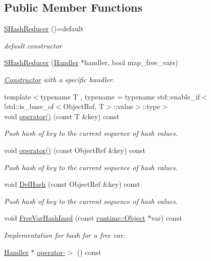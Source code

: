 \subsection*{Public Member Functions}
\begin{DoxyCompactItemize}
\item 
\hyperlink{classtvm_1_1SHashReducer_af7eb7ccc3e5863fe580f1b8dceac5d88}{S\+Hash\+Reducer} ()=default
\begin{DoxyCompactList}\small\item\em default constructor \end{DoxyCompactList}\item 
\hyperlink{classtvm_1_1SHashReducer_acb4d90cb74f617620d0027649adf8f17}{S\+Hash\+Reducer} (\hyperlink{classtvm_1_1SHashReducer_1_1Handler}{Handler} $\ast$handler, bool map\+\_\+free\+\_\+vars)
\begin{DoxyCompactList}\small\item\em \hyperlink{classtvm_1_1Constructor}{Constructor} with a specific handler. \end{DoxyCompactList}\item 
{\footnotesize template$<$typename T , typename  = typename std\+::enable\+\_\+if$<$             !std\+::is\+\_\+base\+\_\+of$<$\+Object\+Ref, T$>$\+::value$>$\+::type$>$ }\\void \hyperlink{classtvm_1_1SHashReducer_a22960af2148b4db6efea3e8d5ee96e52}{operator()} (const T \&key) const 
\begin{DoxyCompactList}\small\item\em Push hash of key to the current sequence of hash values. \end{DoxyCompactList}\item 
void \hyperlink{classtvm_1_1SHashReducer_aa4a96bd8462b6623f9c551f936623588}{operator()} (const Object\+Ref \&key) const 
\begin{DoxyCompactList}\small\item\em Push hash of key to the current sequence of hash values. \end{DoxyCompactList}\item 
void \hyperlink{classtvm_1_1SHashReducer_a86a3513ec9866c77c59231663caa28c9}{Def\+Hash} (const Object\+Ref \&key) const 
\begin{DoxyCompactList}\small\item\em Push hash of key to the current sequence of hash values. \end{DoxyCompactList}\item 
void \hyperlink{classtvm_1_1SHashReducer_ab9cf0c638238f55dd5b6f155d65f92ef}{Free\+Var\+Hash\+Impl} (const \hyperlink{classtvm_1_1runtime_1_1Object}{runtime\+::\+Object} $\ast$var) const 
\begin{DoxyCompactList}\small\item\em Implementation for hash for a free var. \end{DoxyCompactList}\item 
\hyperlink{classtvm_1_1SHashReducer_1_1Handler}{Handler} $\ast$ \hyperlink{classtvm_1_1SHashReducer_a492c322a6926478d8f0ef38afd57d8b9}{operator-\/$>$} () const 
\end{DoxyCompactItemize}



